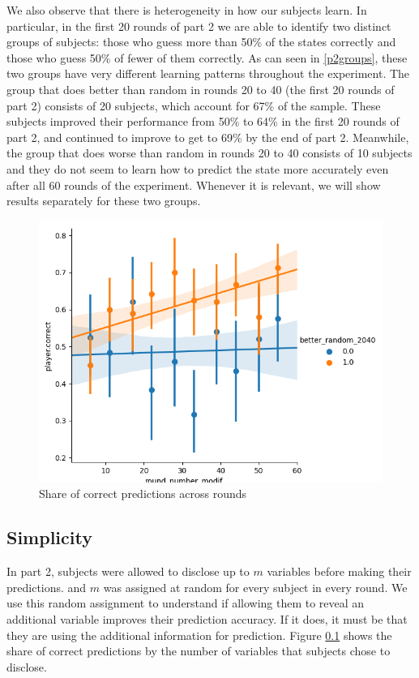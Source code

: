 \documentclass[
  12pt,
]{article}
\begin{document}
We also observe that there is heterogeneity in how our subjects learn.
In particular, in the first 20 rounds of part 2 we are able to identify
two distinct groups of subjects: those who guess more than 50\% of the
states correctly and those who guess 50\% of fewer of them correctly. As
can seen in \ref{p2groups}, these two groups have very different
learning patterns throughout the experiment. The group that does better
than random in rounds 20 to 40 (the first 20 rounds of part 2) consists
of 20 subjects, which account for 67\% of the sample. These subjects
improved their performance from 50\% to 64\% in the first 20 rounds of
part 2, and continued to improve to get to 69\% by the end of part 2.
Meanwhile, the group that does worse than random in rounds 20 to 40
consists of 10 subjects and they do not seem to learn how to predict the
state more accurately even after all 60 rounds of the experiment.
Whenever it is relevant, we will show results separately for these two
groups.

\begin{figure}

{\centering \includegraphics[width=0.5\linewidth]{../computed_objects/figures/p2_correct_rounds} 

}

\caption{\label{p2groups} Share of correct predictions across rounds}\label{fig:p2groups}
\end{figure}

\hypertarget{simplicity}{%
\subsection{Simplicity}\label{simplicity}}

In part 2, subjects were allowed to disclose up to \(m\) variables
before making their predictions. and \(m\) was assigned at random for
every subject in every round. We use this random assignment to
understand if allowing them to reveal an additional variable improves
their prediction accuracy. If it does, it must be that they are using
the additional information for prediction. Figure \ref{simplicity} shows
the share of correct predictions by the number of variables that
subjects chose to disclose.
\end{document}
